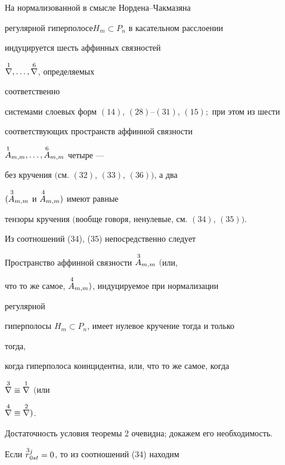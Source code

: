 \begin{thm} На нормализованной в смысле Нордена--Чакмазяна  


регулярной гиперполосе\linebreak $H_m\subset P_n$ в касательном расслоении 


индуцируется шесть аффинных связностей


$\overset{1}{\nabla}{},\dotsc,\overset{6}{\nabla}{}$, определяемых 


соответственно 


системами слоевых форм $(14)$, $(28)$--$(31)$, $(15);$ при этом из шести 


соответствующих пространств аффинной связности


$\overset{1}{A}{}_{m,m},\dotsc,\overset{6}{A}{}_{m,m}$ четыре --- 


без кручения $($см. $(32)$, $(33)$, $(36))$, а два 


$(\overset{\,3}{A}{}_{m,m}$ и $\overset{\,4}{A}{}_{m,m})$ имеют равные 


тензоры кручения $($вообще говоря, ненулевые, см. $(34)$, $(35))$.  


\end{thm} 


 


Из соотношений (34), (35) непосредственно следует 


 


\begin{thm} Пространство аффинной связности $\overset{\,3}{A}{}_{m,m}$ $($или, 


что то же самое, $\overset{\,4}{A}{}_{m,m})$, индуцируемое при нормализации 


регулярной 


гиперполосы $H_m\subset P_n$, имеет нулевое кручение тогда и только 


тогда,  


когда гиперполоса коинцидентна, или, что то же самое, когда 


$\overset{3}{\nabla}{}\equiv\overset{1}{\nabla}{}$ $($или 


$\overset{4}{\nabla}{}\equiv\overset{2}{\nabla}{})$. 


\end{thm} 


 


Достаточность условия теоремы 2 очевидна; докажем его необходимость. 


Если $\overset{\,3}{r}{}^j_{0s t}=0$, то из соотношений (34) находим 


